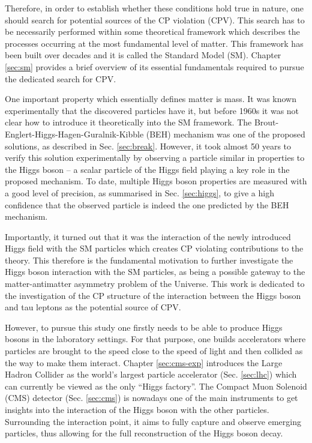 Therefore, in order to establish whether these conditions hold true in nature, one should search for potential sources of the CP violation (CPV). This search has to be necessarily performed within some theoretical framework which describes the processes occurring at the most fundamental level of matter. This framework has been built over decades and it is called the Standard Model (SM). Chapter \ref{sec:sm} provides a brief overview of its essential fundamentals required to pursue the dedicated search for CPV. 

One important property which essentially defines matter is mass. It was known experimentally that the discovered particles have it, but before 1960s it was not clear how to introduce it theoretically into the SM framework. The Brout-Englert-Higgs-Hagen-Guralnik-Kibble (BEH) mechanism was one of the proposed solutions, as described in Sec. \ref{sec:break}. However, it took almost 50 years to verify this solution experimentally by observing a particle similar in properties to the Higgs boson -- a scalar particle of the Higgs field playing a key role in the proposed mechanism. To date, multiple Higgs boson properties are measured with a good level of precision, as summarised in Sec. \ref{sec:higgs}, to give a high confidence that the observed particle is indeed the one predicted by the BEH mechanism. 

Importantly, it turned out that it was the interaction of the newly introduced Higgs field with the SM particles which creates CP violating contributions to the theory. This therefore is the fundamental motivation to further investigate the Higgs boson interaction with the SM particles, as being a possible gateway to the matter-antimatter asymmetry problem of the Universe. This work is dedicated to the investigation of the CP structure of the interaction between the Higgs boson and tau leptons as the potential source of CPV.  

However, to pursue this study one firstly needs to be able to produce Higgs bosons in the laboratory settings. For that purpose, one builds accelerators where particles are brought to the speed close to the speed of light and then collided as the way to make them interact. Chapter \ref{sec:cms-exp} introduces the Large Hadron Collider as the world’s largest particle accelerator (Sec. \ref{sec:lhc}) which can currently be viewed as the only \enquote{Higgs factory}. The Compact Muon Solenoid (CMS) detector (Sec. \ref{sec:cms}) is nowadays one of the main instruments to get insights into the interaction of the Higgs boson with the other particles. Surrounding the interaction point, it aims to fully capture and observe emerging particles, thus allowing for the full reconstruction of the Higgs boson decay.

